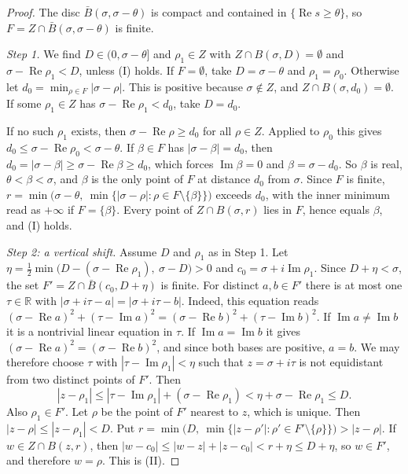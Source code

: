 \documentclass[11pt]{amsart}
\newcommand{\R}{\mathbb{R}}
\newcommand{\re}{\operatorname{Re}}
\newcommand{\im}{\operatorname{Im}}
\theoremstyle{plain}
\theoremstyle{definition}
\numberwithin{equation}{section}
\begin{document}
\begin{proof}
The disc $\bar B(\sigma,\sigma-\theta)$ is compact and contained in $\{\re s\ge\theta\}$, so
$F=Z\cap\bar B(\sigma,\sigma-\theta)$ is finite.

\emph{Step 1.} We find $D\in(0,\sigma-\theta]$ and $\rho_1\in Z$ with $Z\cap B(\sigma,D)=\emptyset$
and $\sigma-\re\rho_1<D$, unless (I) holds. If $F=\emptyset$, take $D=\sigma-\theta$ and
$\rho_1=\rho_0$. Otherwise let $d_0=\min_{\rho\in F}|\sigma-\rho|$. This is positive because
$\sigma\notin Z$, and $Z\cap B(\sigma,d_0)=\emptyset$. If some $\rho_1\in Z$ has
$\sigma-\re\rho_1<d_0$, take $D=d_0$.

If no such $\rho_1$ exists, then $\sigma-\re\rho\ge d_0$ for all $\rho\in Z$. Applied to $\rho_0$
this gives $d_0\le\sigma-\re\rho_0<\sigma-\theta$. If $\beta\in F$ has $|\sigma-\beta|=d_0$, then
$d_0=|\sigma-\beta|\ge\sigma-\re\beta\ge d_0$, which forces $\im\beta=0$ and $\beta=\sigma-d_0$.
So $\beta$ is real, $\theta<\beta<\sigma$, and $\beta$ is the only point of $F$ at distance $d_0$
from $\sigma$. Since $F$ is finite,
$r=\min\bigl(\sigma-\theta,\ \min\{|\sigma-\rho|:\rho\in F\setminus\{\beta\}\}\bigr)$ exceeds
$d_0$, with the inner minimum read as $+\infty$ if $F=\{\beta\}$. Every point of $Z\cap B(\sigma,r)$
lies in $F$, hence equals $\beta$, and (I) holds.

\emph{Step 2: a vertical shift.} Assume $D$ and $\rho_1$ as in Step 1. Let
$\eta=\frac12\min\bigl(D-(\sigma-\re\rho_1),\ \sigma-D\bigr)>0$ and $c_0=\sigma+i\im\rho_1$. Since
$D+\eta<\sigma$, the set $F'=Z\cap\bar B(c_0,D+\eta)$ is finite. For distinct $a,b\in F'$ there is
at most one $\tau\in\R$ with $|\sigma+i\tau-a|=|\sigma+i\tau-b|$. Indeed, this equation reads
$(\sigma-\re a)^2+(\tau-\im a)^2=(\sigma-\re b)^2+(\tau-\im b)^2$. If $\im a\neq\im b$ it is a
nontrivial linear equation in $\tau$. If $\im a=\im b$ it gives
$(\sigma-\re a)^2=(\sigma-\re b)^2$, and since both bases are positive, $a=b$. We may therefore
choose $\tau$ with $|\tau-\im\rho_1|<\eta$ such that $z=\sigma+i\tau$ is not equidistant from two
distinct points of $F'$. Then
\[
|z-\rho_1|\le|\tau-\im\rho_1|+(\sigma-\re\rho_1)<\eta+\sigma-\re\rho_1\le D .
\]
Also $\rho_1\in F'$. Let $\rho$ be the point of $F'$ nearest to $z$, which is unique. Then
$|z-\rho|\le|z-\rho_1|<D$. Put
$r=\min\bigl(D,\ \min\{|z-\rho'|:\rho'\in F'\setminus\{\rho\}\}\bigr)>|z-\rho|$. If
$w\in Z\cap B(z,r)$, then $|w-c_0|\le|w-z|+|z-c_0|<r+\eta\le D+\eta$, so $w\in F'$, and therefore
$w=\rho$. This is (II).
\end{proof}
\end{document}
